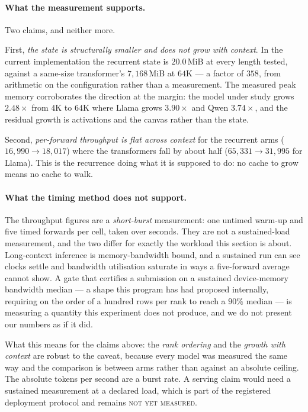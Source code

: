 \documentclass[11pt]{article}
\newcommand{\notrun}{\textsc{not yet measured}}
\begin{document}
\paragraph{What the measurement supports.} Two claims, and neither more.

First, \emph{the state is structurally smaller and does not grow with context}. In the
current implementation the recurrent state is $20.0$\,MiB at every length tested, against a
same-size transformer's $7{,}168$\,MiB at $64$K --- a factor of $358$, from arithmetic on
the configuration rather than a measurement. The measured peak memory corroborates the
direction at the margin: the model under study grows $2.48\times$ from $4$K to $64$K where
Llama grows $3.90\times$ and Qwen $3.74\times$, and the residual growth is activations and
the canvas rather than the state.

Second, \emph{per-forward throughput is flat across context} for the recurrent arms
($16{,}990 \rightarrow 18{,}017$) where the transformers fall by about half
($65,331 \rightarrow 31{,}995$ for Llama). This is the recurrence doing what it is
supposed to do: no cache to grow means no cache to walk.

\paragraph{What the timing method does not support.} The throughput figures are a
\emph{short-burst} measurement: one untimed warm-up and five timed forwards per cell, taken
over seconds. They are not a sustained-load measurement, and the two differ for exactly the
workload this section is about. Long-context inference is memory-bandwidth bound, and a
sustained run can see clocks settle and bandwidth utilisation saturate in ways a five-forward
average cannot show. A gate that certifies a submission on a sustained device-memory
bandwidth median --- a shape this program has had proposed internally, requiring on the order
of a hundred rows per rank to reach a $90\%$ median --- is measuring a quantity this
experiment does not produce, and we do not present our numbers as if it did.

What this means for the claims above: the \emph{rank ordering} and the \emph{growth with
context} are robust to the caveat, because every model was measured the same way and the
comparison is between arms rather than against an absolute ceiling. The absolute tokens per
second are a burst rate. A serving claim would need a sustained measurement at a declared
load, which is part of the registered deployment protocol and remains \notrun{}.
\end{document}
